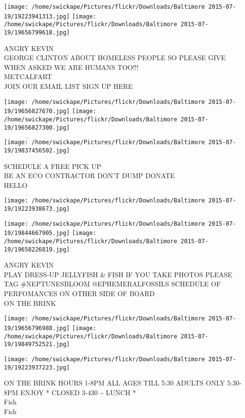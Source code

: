 \documentclass[10pt,letterpaper]{article}
\begin{document}
\texttt{[image: /home/swickape/Pictures/flickr/Downloads/Baltimore 2015-07-19/19223941313.jpg]}
\texttt{[image: /home/swickape/Pictures/flickr/Downloads/Baltimore 2015-07-19/19656799618.jpg]}

ANGRY KEVIN\\
GEORGE CLINTON ABOUT HOMELESS PEOPLE SO PLEASE GIVE WHEN ASKED WE ARE HUMANS TOO!!!\\
METCALFART\\
JOIN OUR EMAIL LIST SIGN UP HERE\\
\pagebreak

\texttt{[image: /home/swickape/Pictures/flickr/Downloads/Baltimore 2015-07-19/19656827670.jpg]}
\texttt{[image: /home/swickape/Pictures/flickr/Downloads/Baltimore 2015-07-19/19656827300.jpg]}

\texttt{[image: /home/swickape/Pictures/flickr/Downloads/Baltimore 2015-07-19/19837456502.jpg]}

SCHEDULE A FREE PICK UP\\
BE AN ECO CONTRACTOR DON'T DUMP DONATE\\
HELLO\\
\pagebreak

\texttt{[image: /home/swickape/Pictures/flickr/Downloads/Baltimore 2015-07-19/19223938673.jpg]}

\vspace{0.25in}
\texttt{[image: /home/swickape/Pictures/flickr/Downloads/Baltimore 2015-07-19/19844667905.jpg]}
\texttt{[image: /home/swickape/Pictures/flickr/Downloads/Baltimore 2015-07-19/19658226819.jpg]}

ANGRY KEVIN\\
PLAY DRESS{-}UP JELLYFISH \& FISH IF YOU TAKE PHOTOS PLEASE TAG \#NEPTUNESBLOOM @EPHEMERALFOSSILS SCHEDULE OF PERFOMANCES ON OTHER SIDE OF BOARD\\
ON THE BRINK\\
\pagebreak

\texttt{[image: /home/swickape/Pictures/flickr/Downloads/Baltimore 2015-07-19/19656796988.jpg]}
\texttt{[image: /home/swickape/Pictures/flickr/Downloads/Baltimore 2015-07-19/19849752521.jpg]}

\vspace{0.25in}
\texttt{[image: /home/swickape/Pictures/flickr/Downloads/Baltimore 2015-07-19/19223937223.jpg]}

ON THE BRINK HOURS 1{-}8PM ALL AGES TILL 5:30 ADULTS ONLY 5:30{-}8PM ENJOY * CLOSED 3{-}430 \textasciitilde{} LUNCH *\\
Fish\\
Fish\\
\pagebreak
\end{document}
